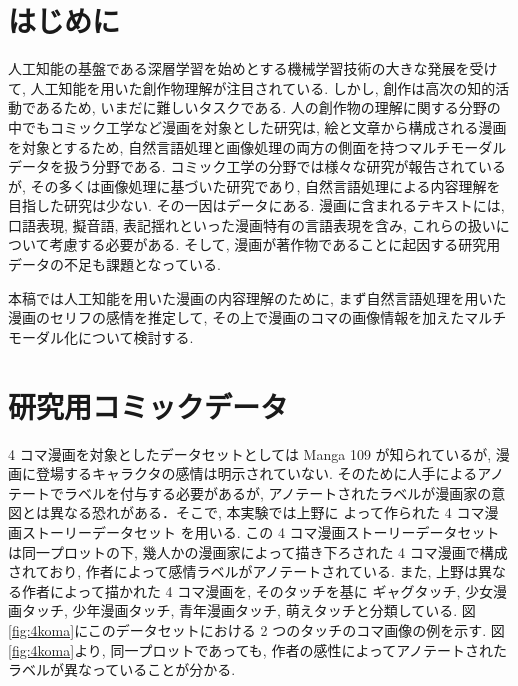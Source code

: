 \documentclass[twocolumn]{jarticle}     %
\begin{document}

\section{はじめに}
人工知能の基盤である深層学習を始めとする機械学習技術の大きな発展を受けて, 人工知能を用いた創作物理解が注目されている. しかし, 創作は高次の知的活動であるため, いまだに難しいタスクである.
人の創作物の理解に関する分野の中でもコミック工学など漫画を対象とした研究は, 絵と文章から構成される漫画を対象とするため, 自然言語処理と画像処理の両方の側面を持つマルチモーダルデータを扱う分野である. コミック工学の分野では様々な研究が報告されているが, その多くは画像処理に基づいた研究であり, 自然言語処理による内容理解を目指した研究は少ない. その一因はデータにある. 漫画に含まれるテキストには, 口語表現, 擬音語, 表記揺れといった漫画特有の言語表現を含み, これらの扱いについて考慮する必要がある. そして, 漫画が著作物であることに起因する研究用データの不足も課題となっている.

本稿では人工知能を用いた漫画の内容理解のために, まず自然言語処理を用いた漫画のセリフの感情を推定して, その上で漫画のコマの画像情報を加えたマルチモーダル化について検討する.

\section{研究用コミックデータ}
4 コマ漫画を対象としたデータセットとしては Manga 109 が知られているが, 漫画に登場するキャラクタの感情は明示されていない. そのために人手によるアノテートでラベルを付与する必要があるが, アノテートされたラベルが漫画家の意図とは異なる恐れがある．そこで, 本実験では上野に
よって作られた 4 コマ漫画ストーリーデータセット\cite{ueno_miki2018} を用いる. この 4 コマ漫画ストーリーデータセットは同一プロットの下, 幾人かの漫画家によって描き下ろされた 4 コマ漫画で構成されており, 作者によって感情ラベルがアノテートされている.
また, 上野は異なる作者によって描かれた 4 コマ漫画を, そのタッチを基に
ギャグタッチ, 少女漫画タッチ, 少年漫画タッチ, 青年漫画タッチ, 萌えタッチと分類している. 図\ref{fig:4koma}にこのデータセットにおける 2 つのタッチのコマ画像の例を示す. 図\ref{fig:4koma}より, 同一プロットであっても, 作者の感性によってアノテートされたラベルが異なっていることが分かる.
\end{document}
